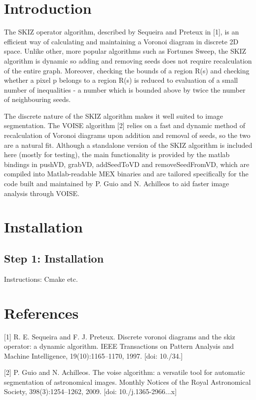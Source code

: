\hypertarget{index_intro_sec}{}\section{Introduction}\label{index_intro_sec}
The S\+K\+IZ operator algorithm, described by Sequeira and Preteux in \mbox{[}1\mbox{]}, is an efficient way of calculating and maintaining a Voronoi diagram in discrete 2D space. Unlike other, more popular algorithms such as Fortune\textquotesingle{}s Sweep, the S\+K\+IZ algorithm is dynamic so adding and removing seeds does not require recalculation of the entire graph. Moreover, checking the bounds of a region R(s) and checking whether a pixel p belongs to a region R(s) is reduced to evaluation of a small number of inequalities -\/ a number which is bounded above by twice the number of neighbouring seeds.

The discrete nature of the S\+K\+IZ algorithm makes it well suited to image segmentation. The V\+O\+I\+SE algorithm \mbox{[}2\mbox{]} relies on a fast and dynamic method of recalculation of Voronoi diagrams upon addition and removal of seeds, so the two are a natural fit. Although a standalone version of the S\+K\+IZ algorithm is included here (mostly for testing), the main functionality is provided by the matlab bindings in push\+VD, grab\+VD, add\+Seed\+To\+VD and remove\+Seed\+From\+VD, which are compiled into Matlab-\/readable M\+EX binaries and are tailored specifically for the code built and maintained by P. Guio and N. Achilleos to aid faster image analysis through V\+O\+I\+SE.\hypertarget{index_install_sec}{}\section{Installation}\label{index_install_sec}
\hypertarget{index_step1}{}\subsection{Step 1\+: Installation}\label{index_step1}
Instructions\+: Cmake etc.\hypertarget{index_references_sec}{}\section{References}\label{index_references_sec}
\mbox{[}1\mbox{]} R. E. Sequeira and F. J. Preteux. Discrete voronoi diagrams and the skiz operator\+: a dynamic algorithm. I\+E\+EE Transactions on Pattern Analysis and Machine Intelligence, 19(10)\+:1165–1170, 1997. \mbox{[}doi\+: 10./34.\mbox{]}

\mbox{[}2\mbox{]} P. Guio and N. Achilleos. The voise algorithm\+: a versatile tool for automatic segmentation of astronomical images. Monthly Notices of the Royal Astronomical Society, 398(3)\+:1254–1262, 2009. \mbox{[}doi\+: 10./j.1365-\/2966...\+x\mbox{]} 
